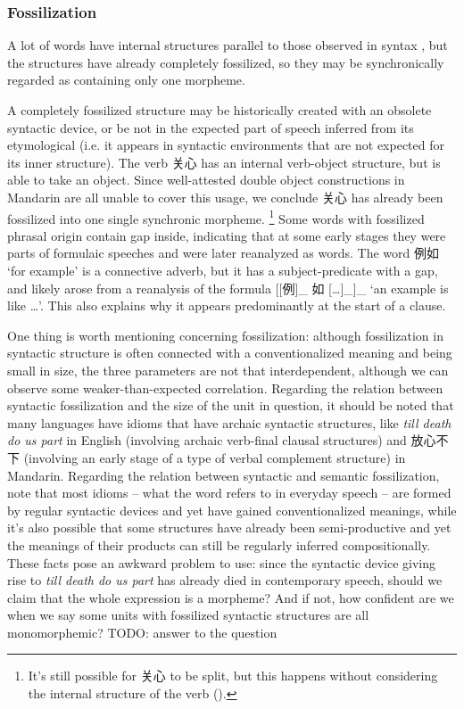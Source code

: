 \documentclass[UTF8, a4paper, oneside, scheme=plain]{ctexrep}
\newcommand*{\citesec}[1]{\S~{#1}}
\newcommand{\corpus}[1]{\emph{#1}}
\newcommand{\translate}[1]{`#1'}
\begin{document}
\subsubsection{Fossilization}\label{sec:pos.morpheme.fossilization}

A lot of words have internal structures parallel to 
those observed in syntax \citep[\citesec{2.6}]{zhudexigrammar},
but the structures have already completely fossilized, 
so they may be synchronically regarded as containing only one morpheme.

A completely fossilized structure 
may be historically created with an obsolete syntactic device, 
or be not in the expected part of speech inferred from its etymological
(i.e. it appears in syntactic environments that are not expected 
for its inner structure).
The verb 关心 has an internal verb-object structure, 
but is able to take an object.
Since well-attested double object constructions in Mandarin
are all unable to cover this usage,
we conclude 关心 has already been fossilized into one single synchronic morpheme.%
\footnote{
    It's still possible for 关心 to be split, 
    but this happens without considering the internal structure of the verb
    ().
}
Some words with fossilized phrasal origin 
contain gap inside, 
indicating that at some early stages 
they were parts of formulaic speeches 
and were later reanalyzed as words.
The word 例如 \translate{for example}
is a connective adverb, 
but it has a subject-predicate with a gap,
and likely arose from a reanalysis of the formula 
[[例]_{} 如 [\dots]_{}]_{}
\translate{an example is like \dots}.
This also explains why it appears predominantly at the start of a clause.

One thing is worth mentioning concerning fossilization: 
although fossilization in syntactic structure 
is often connected with 
a conventionalized meaning and being small in size,
the three parameters are not that interdependent, 
although we can observe some weaker-than-expected correlation.
Regarding the relation between syntactic fossilization 
and the size of the unit in question, 
it should be noted that many languages have 
idioms that have archaic syntactic structures, 
like \corpus{till death do us part} in English 
(involving archaic verb-final clausal structures)
and 放心不下 (involving an early stage of a type of verbal complement structure) 
in Mandarin.
Regarding the relation between syntactic and semantic fossilization, 
note that most idioms -- what the word refers to in everyday speech -- 
are formed by regular syntactic devices and yet have gained conventionalized meanings, 
while it's also possible that some structures have already been semi-productive
and yet the meanings of their products can still be 
regularly inferred compositionally.
These facts pose an awkward problem to use: 
since the syntactic device giving rise to \corpus{till death do us part}
has already died in contemporary speech, 
should we claim that the whole expression is a morpheme?
And if not, how confident are we 
when we say some units with fossilized syntactic structures 
are all monomorphemic?
TODO: answer to the question
\end{document}
